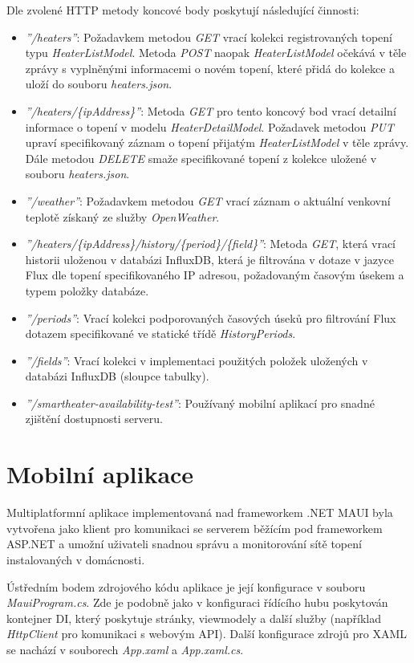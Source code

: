 \noindent Dle zvolené HTTP metody koncové body poskytují následující činnosti:
\begin{itemize}
    \item {\it ''/heaters''}: Požadavkem metodou {\it GET} vrací kolekci registrovaných topení typu {\it HeaterListModel}. Metoda {\it POST} naopak {\it HeaterListModel} očekává v těle zprávy s vyplněnými informacemi o novém topení, které přidá do kolekce a uloží do souboru {\it heaters.json}.
    \item {\it ''/heaters/\{ipAddress\}''}: Metoda {\it GET} pro tento koncový bod vrací detailní informace o topení v modelu {\it HeaterDetailModel}. Požadavek metodou {\it PUT} upraví specifikovaný záznam o topení přijatým {\it HeaterListModel} v těle zprávy. Dále metodou {\it DELETE} smaže specifikované topení z kolekce uložené v souboru {\it heaters.json}.
    \item {\it ''/weather''}: Požadavkem metodou {\it GET} vrací záznam o aktuální venkovní teplotě získaný ze služby {\it OpenWeather}.
    \item {\it ''/heaters/\{ipAddress\}/history/\{period\}/\{field\}''}: Metoda {\it GET}, která vrací historii uloženou v databázi InfluxDB, která je filtrována v dotaze v jazyce Flux dle topení specifikovaného IP adresou, požadovaným časovým úsekem a typem položky databáze.
    \item {\it ''/periods''}: Vrací kolekci podporovaných časových úseků pro filtrování Flux dotazem specifikované ve statické třídě {\it HistoryPeriods}.
    \item {\it ''/fields''}: Vrací kolekci v implementaci použitých položek uložených v databázi InfluxDB (sloupce tabulky). 
    \item {\it ''/smartheater-availability-test''}: Používaný mobilní aplikací pro snadné zjištění dostupnosti serveru.
\end{itemize}


\section{Mobilní aplikace}
Multiplatformní aplikace implementovaná nad frameworkem .NET MAUI byla vytvořena jako klient pro komunikaci se serverem běžícím pod frameworkem ASP.NET a umožní uživateli snadnou správu a monitorování sítě topení instalovaných v domácnosti.

Ústředním bodem zdrojového kódu aplikace je její konfigurace v souboru {\it MauiProgram.cs}. Zde je podobně jako v konfiguraci řídícího hubu poskytován kontejner DI, který poskytuje stránky, viewmodely a další služby (například {\it HttpClient} pro komunikaci s webovým API). Další konfigurace zdrojů pro XAML se nachází v souborech {\it App.xaml} a {\it App.xaml.cs}.


